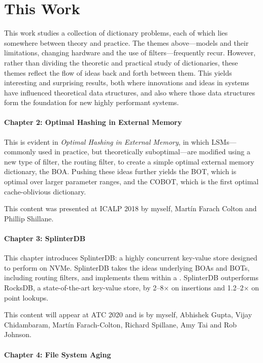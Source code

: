 \section{This Work}

This work studies a collection of dictionary problems, each of which lies
somewhere between theory and practice. The themes above---models and their
limitations, changing hardware and the use of filters---frequently recur.
However, rather than dividing the theoretic and practical study of
dictionaries, these themes reflect the flow of ideas back and forth between
them. This yields interesting and surprising results, both where innovations
and ideas in systems have influenced theoretical data structures, and also
where those data structures form the foundation for new highly performant
systems.

\paragraph{Chapter 2: Optimal Hashing in External Memory}

This is evident in \textit{Optimal Hashing in External Memory}, in which
LSMs---commonly used in practice, but theoretically suboptimal---are modified
using a new type of filter, the routing filter, to create a simple optimal
external memory dictionary, the BOA. Pushing these ideas further yields the BOT,
which is optimal over larger parameter ranges, and the COBOT, which is the
first optimal cache-oblivious dictionary.

This content was presented at ICALP 2018 by myself, Mart\'in Farach Colton and
Phillip Shillane.

\paragraph{Chapter 3: SplinterDB}

This chapter introduces SplinterDB: a highly concurrent key-value store
designed to perform on NVMe. SplinterDB takes the ideas underlying BOAs and
BOTs, including routing filters, and implements them within a \bet. SplinterDB
outperforms RocksDB, a state-of-the-art key-value store, by 2--8$\times$ on
insertions and 1.2--2$\times$ on point lookups.

This content will appear at ATC 2020 and is by myself, Abhishek Gupta, Vijay
Chidambaram, Mart\'in Farach-Colton, Richard Spillane, Amy Tai and Rob Johnson.

\paragraph{Chapter 4: File System Aging}

